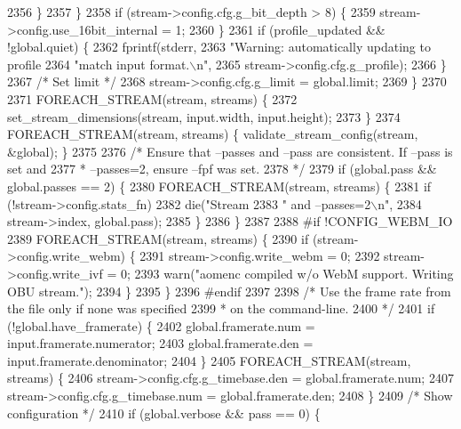 \begin{DoxyCodeInclude}
{{{{{{{{{{{{{{{{{{{{{{{{{{{{{{{{{{{{{{{{{{{{{{{{{{{{{{{{{{{{{{{2356         \}
2357       \}
2358       \textcolor{keywordflow}{if} (stream->config.cfg.g\_bit\_depth > 8) \{
2359         stream->config.use\_16bit\_internal = 1;
2360       \}
2361       \textcolor{keywordflow}{if} (profile\_updated && !global.quiet) \{
2362         fprintf(stderr,
2363             \textcolor{stringliteral}{"Warning: automatically updating to profile %
2364             \textcolor{stringliteral}{"match input format.\(\backslash\)n"},
2365             stream->config.cfg.g\_profile);
2366       \}
2367       \textcolor{comment}{/* Set limit */}
2368       stream->config.cfg.g\_limit = global.limit;
2369     \}
2370 
2371     FOREACH\_STREAM(stream, streams) \{
2372       set\_stream\_dimensions(stream, input.width, input.height);
2373     \}
2374     FOREACH\_STREAM(stream, streams) \{ validate\_stream\_config(stream, &global); \}
2375 
2376     \textcolor{comment}{/* Ensure that --passes and --pass are consistent. If --pass is set and}
2377 \textcolor{comment}{     * --passes=2, ensure --fpf was set.}
2378 \textcolor{comment}{     */}
2379     \textcolor{keywordflow}{if} (global.pass && global.passes == 2) \{
2380       FOREACH\_STREAM(stream, streams) \{
2381         \textcolor{keywordflow}{if} (!stream->config.stats\_fn)
2382           die(\textcolor{stringliteral}{"Stream %
2383               \textcolor{stringliteral}{" and --passes=2\(\backslash\)n"},
2384               stream->index, global.pass);
2385       \}
2386     \}
2387 
2388 \textcolor{preprocessor}{#if !CONFIG\_WEBM\_IO}
2389     FOREACH\_STREAM(stream, streams) \{
2390       \textcolor{keywordflow}{if} (stream->config.write\_webm) \{
2391         stream->config.write\_webm = 0;
2392         stream->config.write\_ivf = 0;
2393         warn(\textcolor{stringliteral}{"aomenc compiled w/o WebM support. Writing OBU stream."});
2394       \}
2395     \}
2396 \textcolor{preprocessor}{#endif}
2397 
2398     \textcolor{comment}{/* Use the frame rate from the file only if none was specified}
2399 \textcolor{comment}{     * on the command-line.}
2400 \textcolor{comment}{     */}
2401     \textcolor{keywordflow}{if} (!global.have\_framerate) \{
2402       global.framerate.num = input.framerate.numerator;
2403       global.framerate.den = input.framerate.denominator;
2404     \}
2405     FOREACH\_STREAM(stream, streams) \{
2406       stream->config.cfg.g\_timebase.den = global.framerate.num;
2407       stream->config.cfg.g\_timebase.num = global.framerate.den;
2408     \}
2409     \textcolor{comment}{/* Show configuration */}
2410     \textcolor{keywordflow}{if} (global.verbose && pass == 0) \{
}}}}}}}}}}}}}}}}}}}}}}}}}}}}}}}}}}}}}}}}}}}}}}}}}}}}}}}}}}}}}}}}}
\end{DoxyCodeInclude}
